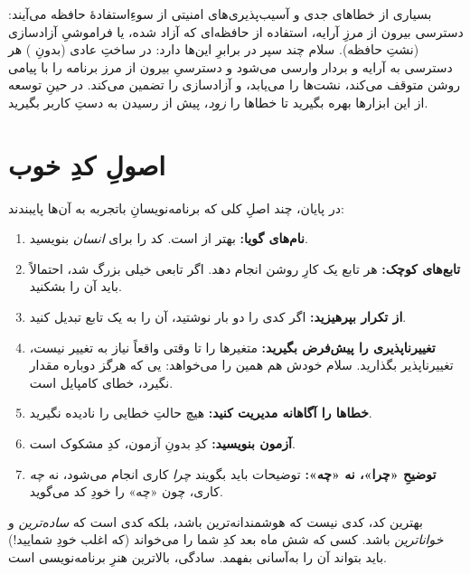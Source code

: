 \begin{deep}
بسیاری از خطاهای جدی و آسیب‌پذیری‌های امنیتی از سوءِاستفادهٔ حافظه می‌آیند:
دسترسی بیرون از مرزِ آرایه، استفاده از حافظه‌ای که آزاد شده، یا فراموشیِ
آزادسازی (نشتِ حافظه). سلام چند سپر در برابرِ این‌ها دارد: در ساختِ عادی (بدونِ
) هر دسترسی به آرایه و بردار وارسی می‌شود و دسترسیِ بیرون از
مرز برنامه را با پیامی روشن متوقف می‌کند،  نشت‌ها را می‌یابد، و
 آزادسازی را تضمین می‌کند. در حینِ توسعه از این ابزارها بهره بگیرید
تا خطاها را \emph{زود}، پیش از رسیدن به دستِ کاربر بگیرید.
\end{deep}

\section{اصول‌ِ کدِ خوب}

در پایان، چند اصلِ کلی که برنامه‌نویسانِ باتجربه به آن‌ها پایبندند:

\begin{enumerate}
  \item \textbf{نام‌های گویا:}  بهتر از  است. کد را
        برای \emph{انسان} بنویسید.
  \item \textbf{تابع‌های کوچک:} هر تابع یک کارِ روشن انجام دهد. اگر تابعی خیلی
        بزرگ شد، احتمالاً باید آن را بشکنید.
  \item \textbf{از تکرار بپرهیزید:} اگر کدی را دو بار نوشتید، آن را به یک تابع
        تبدیل کنید.
  \item \textbf{تغییرناپذیری را پیش‌فرض بگیرید:} متغیرها را تا وقتی واقعاً نیاز
        به تغییر نیست، تغییرناپذیر بگذارید. سلام خودش هم همین را می‌خواهد:
        یی که هرگز دوباره مقدار نگیرد، خطای کامپایل است.
  \item \textbf{خطاها را آگاهانه مدیریت کنید:} هیچ حالتِ خطایی را نادیده
        نگیرید.
  \item \textbf{آزمون بنویسید:} کدِ بدونِ آزمون، کدِ مشکوک است.
  \item \textbf{توضیحِ «چرا»، نه «چه»:} توضیحات باید بگویند \emph{چرا} کاری
        انجام می‌شود، نه \emph{چه} کاری، چون «چه» را خودِ کد می‌گوید.
\end{enumerate}

\begin{tip}
بهترین کد، کدی نیست که هوشمندانه‌ترین باشد، بلکه کدی است که \emph{ساده‌ترین} و
\emph{خواناترین} باشد. کسی که شش ماه بعد کدِ شما را می‌خواند (که اغلب خودِ
شمایید!) باید بتواند آن را به‌آسانی بفهمد. سادگی، بالاترین هنرِ
برنامه‌نویسی است.
\end{tip}

